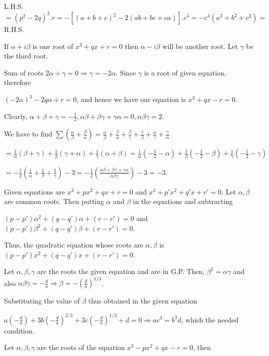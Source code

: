   L.H.S. $= (p^2 - 2q)^3.r = -[(a + b + c)^2 - 2(ab + bc + ca)].c^3 = -c^3(a^2 + b^2 + c^2) =$ R.H.S.
\item If $\alpha + i\beta$ is one root of $x^3 + qx + r = 0$ then $\alpha - i\beta$ will be another
  root. Let $\gamma$ be the third root.

  Sum of roots $2\alpha + \gamma = 0 \Rightarrow \gamma = -2\alpha$. Since $\gamma$ is a root of given
  equation, therefore

  $(-2\alpha)^3 - 2q\alpha + r = 0$, and hence we have our equation is $x^3 + qx - r = 0$.
\item Clearly, $\alpha + \beta + \gamma = -\frac{1}{2}, \alpha\beta + \beta\gamma + \gamma\alpha = 0,
  \alpha\beta\gamma = 2$.

  We have to find $\displaystyle\sum\left(\frac{\alpha}{\beta} + \frac{\beta}{\alpha}\right) =
  \frac{\alpha}{\beta} + \frac{\beta}{\alpha} + \frac{\beta}{\gamma} + \frac{\gamma}{\beta} +
  \frac{\alpha}{\gamma} + \frac{\gamma}{\alpha}$

  $=\frac{1}{\alpha}(\beta + \gamma) + \frac{1}{\beta}(\gamma + \alpha) + \frac{1}{\gamma}(\alpha + \beta) =
  \frac{1}{\alpha}\left(-\frac{1}{2} - \alpha\right) + \frac{1}{\beta}\left(-\frac{1}{2} - \beta\right) +
  \frac{1}{\gamma}\left(-\frac{1}{2} - \gamma\right)$

  $= -\frac{1}{2}\left(\frac{1}{\alpha} + \frac{1}{\beta} + \frac{1}{\gamma}\right) - 3=
  -\frac{1}{2}\left(\frac{\alpha\beta + \beta\gamma + \gamma\alpha}{\alpha\beta\gamma}\right) - 3 = -3$.
\item Given equations are $x^3 + px^2 + qx + r = 0$ and $x^3 + p'x^2 + q'x + r' = 0$. Let $\alpha, \beta$
  are common roots. Then putting $\alpha$ and $\beta$ in the equations and subtracting

  $(p - p')\alpha^2 + (q - q')\alpha + (r - r') = 0$ and $(p - p')\beta^2 + (q - q')\beta + (r - r') = 0$.

  Thus, the quadratic equation whose roots are $\alpha, \beta$ is $(p - p')x^2 + (q - q')x + (r - r') = 0$.
\item Let $\alpha, \beta, \gamma$ are the roots the given equation and are in G.P. Then, $\beta^2 =
  \alpha\gamma$ and also $\alpha\beta\gamma = -\frac{d}{a} \Rightarrow \beta =
  -\left(\frac{d}{a}\right)^{1/3}$.

  Substituting the value of $\beta$ thus obtained in the given equation

  $a\left(-\frac{d}{a}\right) + 3b\left(-\frac{d}{a}\right)^{2/3} + 3c\left(-\frac{d}{a}\right)^{1/3} + d =
  0\Rightarrow ac^3 = b^3d$, which the needed condition.
\item Let $\alpha, \beta, \gamma$ are the roots of the equation $x^3 - px^2 + qx - r = 0$, then

